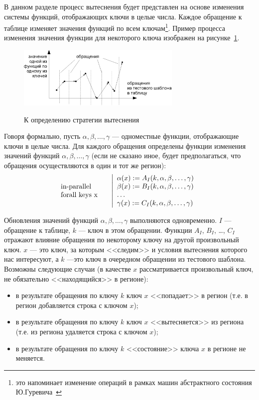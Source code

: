 В данном разделе процесс вытеснения будет представлен на основе изменения  системы функций, отображающих ключи в целые числа. Каждое обращение к таблице изменяет значения функций по всем ключам\footnote{это напоминает изменение операций в рамках машин абстрактного состояния Ю.Гуревича~\cite{ASM}}. Пример процесса изменения значения функции для некоторого ключа изображен на рисунке~\ref{fig:graphic}.

\begin{figure}[h] \center
  \includegraphics[width=0.7\textwidth]{2.theor/graphic}\\
  \caption{К определению стратегии вытеснения}\label{fig:graphic}
\end{figure}

Говоря формально, пусть $\alpha, \beta, \dots, \gamma$ --- одноместные функции,
отображающие ключи в целые числа. Для каждого обращения определены функции
изменения значений функций $\alpha, \beta, \dots, \gamma$ (если не сказано иное, будет предполагаться, что обращения осуществляются в один и тот же регион):
$$\parbox{2.5cm}{in-parallel\\forall keys x~}\left|\begin{array}{l}
\alpha(x) := A_I(k, \alpha, \beta, \dots, \gamma)\\
\beta(x) := B_I(k, \alpha, \beta, \dots, \gamma)\\
\dots\\
\gamma(x) := C_I(k, \alpha, \beta, \dots, \gamma)\\
\end{array}\right.
$$

Обновления значений функций $\alpha, \beta, \dots, \gamma$ выполняются одновременно. $I$ --- обращение к таблице, $k$ --- ключ в этом обращении. Функции $A_I$, $B_I$, \dots, $C_I$ отражают влияние обращения по некоторому ключу на другой произвольный ключ. $x$ --- это ключ, за которым <<следим>> и условия вытеснения которого нас интересуют, а $k$ ---это ключ в очередном обращении из тестового шаблона.
Возможны следующие случаи (в качестве $x$ рассматривается произвольный ключ, не
обязательно <<находящийся>> в регионе):
\begin{itemize}
    \item в результате обращения по ключу $k$ ключ $x$ <<попадает>> в регион (т.е. в регион добавляется строка с ключом $x$);
    \item в результате обращения по ключу $k$ ключ $x$ <<вытесняется>> из региона (т.е. из региона удаляется строка с ключом $x$);
    \item в результате обращения по ключу $k$ <<состояние>> ключа $x$ в регионе не меняется.
\end{itemize}

